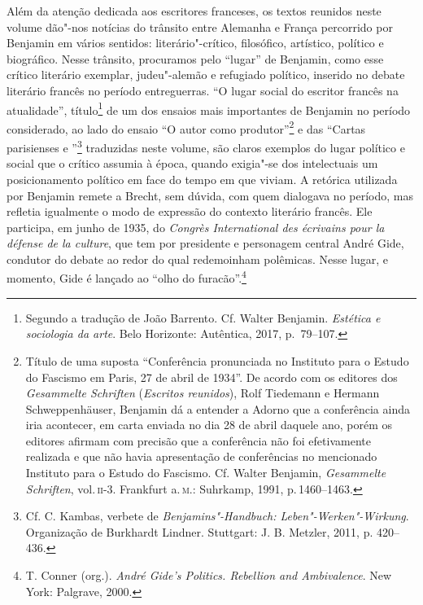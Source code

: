 
Além da atenção dedicada aos escritores franceses, os textos reunidos neste volume dão"-nos notícias do trânsito
entre Alemanha e França percorrido por Benjamin em vários sentidos:
literário"-crítico, filosófico, artístico, político e biográfico. Nesse trânsito, procuramos pelo ``lugar'' de Benjamin, como esse crítico literário exemplar,
judeu"-alemão e refugiado político, inserido no debate literário francês no período
entreguerras. ``O lugar social do escritor francês na atualidade'',
título\footnote{Segundo a tradução de João Barrento. Cf. Walter Benjamin. \textit{Estética e sociologia da arte}. Belo Horizonte: Autêntica,
  2017, p.~79--107.} de um dos ensaios mais importantes de Benjamin no
período considerado, ao lado do ensaio ``O autor como
produtor''\footnote{Título de uma suposta ``Conferência pronunciada no
  Instituto para o Estudo do Fascismo em Paris, 27 de abril de 1934''.
  De acordo com os editores dos \emph{Gesammelte Schriften} (\emph{Escritos reunidos}), Rolf Tiedemann e Hermann Schweppenhäuser,
  Benjamin dá a entender a Adorno que a conferência ainda iria
  acontecer, em carta enviada no dia 28 de abril daquele ano, porém os editores afirmam com
  precisão que a conferência não foi efetivamente realizada e que não
  havia apresentação de conferências no mencionado Instituto para o
  Estudo do Fascismo. Cf. Walter Benjamin, \emph{Gesammelte Schriften}, vol.\,\textsc{ii}-3. Frankfurt a.\,\textsc{m}.: Suhrkamp, 1991, p.\,1460--1463.} e das ``Cartas parisienses  e ''\footnote{Cf.
  C. Kambas, verbete de \emph{Benjamins"-Handbuch: Leben"-Werken"-Wirkung}. Organização de Burkhardt Lindner. Stuttgart: J. B. Metzler, 2011, p. 420--436.}
traduzidas neste volume, são claros exemplos do lugar político e social
que o crítico assumia à época, quando exigia"-se dos intelectuais um
posicionamento político em face do tempo em que viviam. A retórica utilizada por
Benjamin remete a Brecht, sem dúvida, com quem dialogava no período, mas
refletia igualmente o modo de expressão do contexto literário francês.
Ele participa, em junho de 1935, do \emph{Congrès International des
écrivains pour la défense de la culture}, que tem por presidente e
personagem central André Gide, condutor do debate ao redor do qual
redemoinham polêmicas. Nesse lugar, e momento, Gide é lançado ao ``olho do
furacão''.\footnote{T. Conner (org.). \emph{André Gide's Politics. Rebellion and
  Ambivalence}. New York: Palgrave, 2000.}

